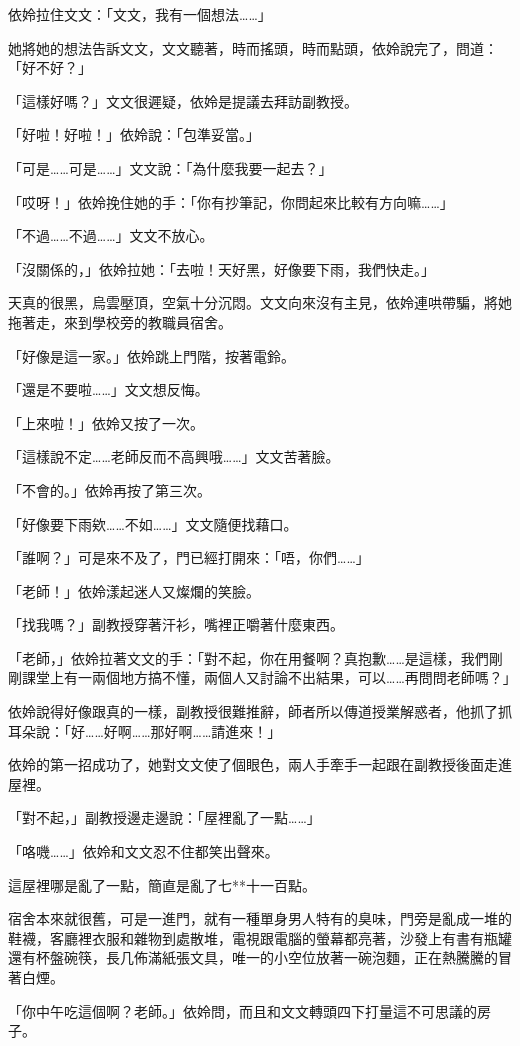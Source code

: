 依姈拉住文文：「文文，我有一個想法……」

她將她的想法告訴文文，文文聽著，時而搖頭，時而點頭，依姈說完了，問道：「好不好？」

「這樣好嗎？」文文很遲疑，依姈是提議去拜訪副教授。

「好啦！好啦！」依姈說：「包準妥當。」

「可是……可是……」文文說：「為什麼我要一起去？」

「哎呀！」依姈挽住她的手：「你有抄筆記，你問起來比較有方向嘛……」

「不過……不過……」文文不放心。

「沒關係的，」依姈拉她：「去啦！天好黑，好像要下雨，我們快走。」

天真的很黑，烏雲壓頂，空氣十分沉悶。文文向來沒有主見，依姈連哄帶騙，將她拖著走，來到學校旁的教職員宿舍。

「好像是這一家。」依姈跳上門階，按著電鈴。

「還是不要啦……」文文想反悔。

「上來啦！」依姈又按了一次。

「這樣說不定……老師反而不高興哦……」文文苦著臉。

「不會的。」依姈再按了第三次。

「好像要下雨欸……不如……」文文隨便找藉口。

「誰啊？」可是來不及了，門已經打開來：「唔，你們……」

「老師！」依姈漾起迷人又燦爛的笑臉。

「找我嗎？」副教授穿著汗衫，嘴裡正嚼著什麼東西。

「老師，」依姈拉著文文的手：「對不起，你在用餐啊？真抱歉……是這樣，我們剛剛課堂上有一兩個地方搞不懂，兩個人又討論不出結果，可以……再問問老師嗎？」

依姈說得好像跟真的一樣，副教授很難推辭，師者所以傳道授業解惑者，他抓了抓耳朵說：「好……好啊……那好啊……請進來！」

依姈的第一招成功了，她對文文使了個眼色，兩人手牽手一起跟在副教授後面走進屋裡。

「對不起，」副教授邊走邊說：「屋裡亂了一點……」

「咯嘰……」依姈和文文忍不住都笑出聲來。

這屋裡哪是亂了一點，簡直是亂了七**十一百點。

宿舍本來就很舊，可是一進門，就有一種單身男人特有的臭味，門旁是亂成一堆的鞋襪，客廳裡衣服和雜物到處散堆，電視跟電腦的螢幕都亮著，沙發上有書有瓶罐還有杯盤碗筷，長几佈滿紙張文具，唯一的小空位放著一碗泡麵，正在熱騰騰的冒著白煙。

「你中午吃這個啊？老師。」依姈問，而且和文文轉頭四下打量這不可思議的房子。

